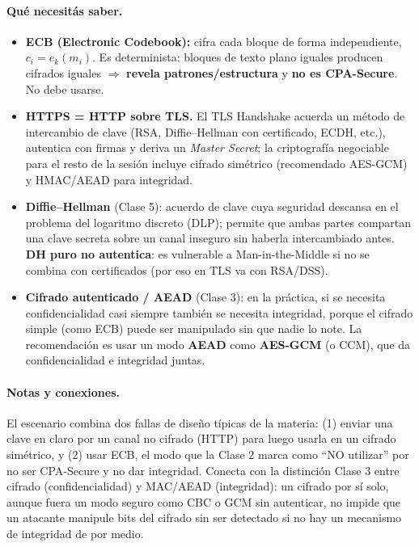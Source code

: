 \paragraph{Qué necesitás saber.}
\begin{itemize}
  \item \textbf{ECB (Electronic Codebook):} cifra cada bloque de forma independiente,
  $c_i=e_k(m_i)$. Es determinista: bloques de texto plano iguales producen cifrados iguales
  $\Rightarrow$ \textbf{revela patrones/estructura} y \textbf{no es CPA-Secure}. No debe
  usarse.
  \item \textbf{HTTPS = HTTP sobre TLS.} El TLS Handshake acuerda un método de intercambio de
  clave (RSA, Diffie--Hellman con certificado, ECDH, etc.), autentica con firmas y deriva un
  \emph{Master Secret}; la criptografía negociable para el resto de la sesión incluye cifrado
  simétrico (recomendado AES-GCM) y HMAC/AEAD para integridad.
  \item \textbf{Diffie--Hellman} (Clase 5): acuerdo de clave cuya seguridad descansa en el
  problema del logaritmo discreto (DLP); permite que ambas partes compartan una clave secreta
  sobre un canal inseguro sin haberla intercambiado antes. \textbf{DH puro no autentica}: es
  vulnerable a Man-in-the-Middle si no se combina con certificados (por eso en TLS va con
  RSA/DSS).
  \item \textbf{Cifrado autenticado / AEAD} (Clase 3): en la práctica, si se necesita
  confidencialidad casi siempre también se necesita integridad, porque el cifrado simple
  (como ECB) puede ser manipulado sin que nadie lo note. La recomendación es usar un modo
  \textbf{AEAD} como \textbf{AES-GCM} (o CCM), que da confidencialidad e integridad juntas.
\end{itemize}

\paragraph{Notas y conexiones.}
El escenario combina dos fallas de diseño típicas de la materia: (1) enviar una clave en
claro por un canal no cifrado (HTTP) para luego usarla en un cifrado simétrico, y (2) usar
ECB, el modo que la Clase 2 marca como ``NO utilizar'' por no ser CPA-Secure y no dar
integridad. Conecta con la distinción Clase 3 entre cifrado (confidencialidad) y MAC/AEAD
(integridad): un cifrado por sí solo, aunque fuera un modo seguro como CBC o GCM sin
autenticar, no impide que un atacante manipule bits del cifrado sin ser detectado si no hay
un mecanismo de integridad de por medio.

